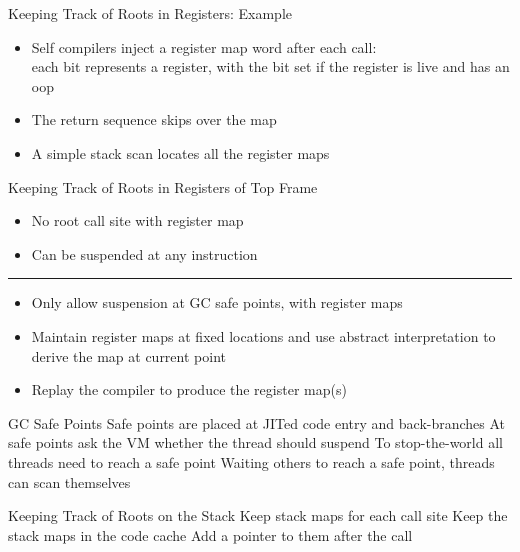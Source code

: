 \documentclass[
14pt,
aspectratio=169,
usenames,
dvipsnames,
x11names]{beamer}
\begin{document}
\begin{frame}{Keeping Track of Roots in Registers: Example}
  \begin{itemize}  \setlength{\itemsep}{\fill}
  \item Self compilers inject a register map word after each call:\\
    each bit represents a register, with the bit set if the register is live and has an oop
  \item The return sequence skips over the map
  \item A simple stack scan locates all the register maps
  \end{itemize}
\end{frame}

\begin{frame}{Keeping Track of Roots in Registers of Top Frame}
  \begin{itemize}  \setlength{\itemsep}{\fill}
  \item No root call site with register map
  \item Can be suspended at any instruction
  \end{itemize}

  \vfill
  \hrule
  \vfill

  \begin{itemize}  \setlength{\itemsep}{\fill}
  \item Only allow suspension at GC \alert{safe points}, with register maps
  \item Maintain register maps at fixed locations and use \alert{abstract interpretation} to derive the map at current point
  \item \alert{Replay} the compiler to produce the register map(s)
  \end{itemize}
\end{frame}

\begin{frame}{GC Safe Points}
  Safe points are placed at JITed \alert{code entry and back-branches}
  \vfill
  At safe points \alert{ask the VM} whether the thread should suspend
  \vfill
  To stop-the-world all threads need to \alert{reach a safe point}
  \vfill
  Waiting others to reach a safe point, threads can \alert{scan themselves}
\end{frame}

\begin{frame}{Keeping Track of Roots on the Stack}
  Keep \alert{stack maps} for each call site
  \vfill
  Keep the stack maps in the code cache
  \vfill
  Add a pointer to them after the call
\end{frame}
\end{document}
